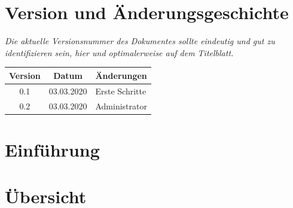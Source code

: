 \documentclass[enabledeprecatedfontcommands,fontsize=12pt,paper=a4,twoside]{scrartcl}
\begin{document}


\newpage

  \thispagestyle{fancy}
  \fancyhead{}
  \fancyfoot{}
  \renewcommand{\headrulewidth}{0.4pt}
  \tableofcontents

\newpage





\section*{Version und Änderungsgeschichte}

{\em Die aktuelle Versionsnummer des Dokumentes sollte eindeutig und gut zu
identifizieren sein, hier und optimalerweise auf dem Titelblatt.}

\begin{tabular}{ccl}
Version & Datum & Änderungen \\
\hline
0.1 & 03.03.2020 & Erste Schritte \\
0.2 & 03.03.2020 & Administrator \\
\end{tabular}



\newpage
\section{Einführung}


\newpage
\section{Übersicht}

\end{document}
